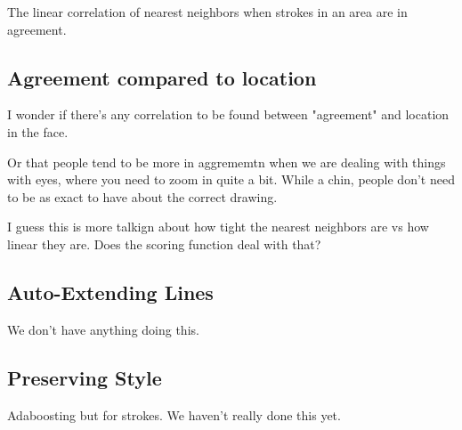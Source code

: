 The linear correlation of nearest neighbors when strokes in an area are in agreement.

\subsection{Agreement compared to location}
I wonder if there's any correlation to be found between "agreement" and location in the face.

Or that people tend to be more in aggrememtn when we are dealing with things with eyes, where you need to zoom in quite a bit. While a chin, people don't need to be as exact to have about the correct drawing. 

I guess this is more talkign about how tight the nearest neighbors are vs how linear they are. Does the scoring function deal with that?

\subsection{Auto-Extending Lines}
We don't have anything doing this.

\subsection{Preserving Style}
Adaboosting but for strokes. We haven't really done this yet.

